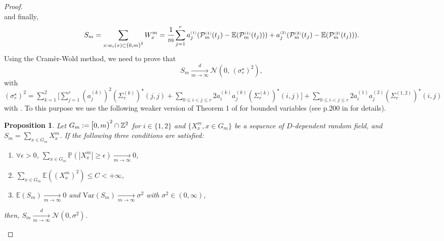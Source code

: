 \documentclass[12pt]{article}
\theoremstyle{Theorem}
\newtheorem{Proposition}[Theorem]{Proposition}
\begin{document}
{\begin{proof}
\begin{equation}
\end{equation}
and finally,
\begin{equation*}
S_m = \sum_{x: w_{i}(x) \subset \text{\larger[1]{$($}}0, m \text{\larger[1]{$)$}}^{2}} W_{x}^{m} = \cfrac{1}{m}\sum_{j = 1}^{r}a^{\scriptscriptstyle (1)}_j(\mathcal{P}^{\scriptscriptstyle (1)}_{m}(t_j) - \mathbb{E}(\mathcal{P}^{\scriptscriptstyle (1)}_{m}(t_j))) + a^{\scriptscriptstyle (2)}_j(\mathcal{P}^{\scriptscriptstyle (2)}_{m}(t_j) - \mathbb{E}(\mathcal{P}^{\scriptscriptstyle (2)}_{m}(t_j))) .
\end{equation*}
Using the Cram\`{e}r-Wold method, we need to prove that
\vspace{-0.2cm}
\begin{equation*}
S_{m} \xrightarrow[m \to \infty]{d} \mathcal{N}\left(0, \, (\sigma^{\star}_{r})^{2} \right),
\end{equation*}
with $(\sigma^{\scriptscriptstyle \star}_{r})^{ \scriptscriptstyle 2} = \sum^{2}_{k = 1}\big[\sum_{j = 1}^{r}(a^{\scriptscriptstyle (k)}_{j})^{2}(\Sigma_{r}^{\scriptscriptstyle (k)})^{\star}(j,j) +  \sum_{0 \leq i < j \leq r} 2a^{\scriptscriptstyle (k)}_{i}a^{\scriptscriptstyle (k)}_{j}(\Sigma_{r}^{\scriptscriptstyle (k)})^{\star}(i,j)\big] + \sum_{0 \leq i < j \leq r}   2a^{\scriptscriptstyle (1)}_{i}a^{\scriptscriptstyle (2)}_{j}(\Sigma_{r}^{\scriptscriptstyle (1, 2)})^{\star}(i,j)$ with . To this purpose we use the following weaker version of Theorem 1 of \cite{Lothar} for bounded variables (see p.200 in \cite{Lothar} for details).
\begin{Proposition}
\label{tclbis}
Let $G_{m} := \text{\larger[1]{$[$}}0, m \text{\larger[1]{$)$}}^{2} \cap \mathbb{Z}^{2}$ for $i \in \{1,2\}$ and $\{X^{m}_{x}, x \in G_{m}\}$ be a sequence of $D$\hspace{-0.05cm}-dependent random field, and $S_m = \sum_{x \in G_{m}} X^{m}_{x}$. If the following three conditions are satisfied:
\begin{enumerate}
\item[(i)]  $\forall \epsilon > 0$, $\sum_{x \in G_m} \mathbb{P}(|X^{m}_{x}| \geq \epsilon) \xrightarrow[m \to  \infty]{} 0 $,
\item[(ii)] $\sum_{x \in G_m} \mathbb{E}((X^{m}_{x})^{2}) \leq C < + \infty$,
\item[(iii)] $\mathbb{E}(S_m) \xrightarrow[m \to  \infty]{} 0$ and $\text{Var}(S_m) \xrightarrow[m \to  \infty]{} \sigma^{2}$ with $\sigma^{2} \in (0,\infty)$,
\end{enumerate}
then, $S_m\xrightarrow[m \to  \infty]{d} \mathcal{N}(0, \sigma^{2})$.

\end{Proposition}
\end{proof}}
\end{document}
